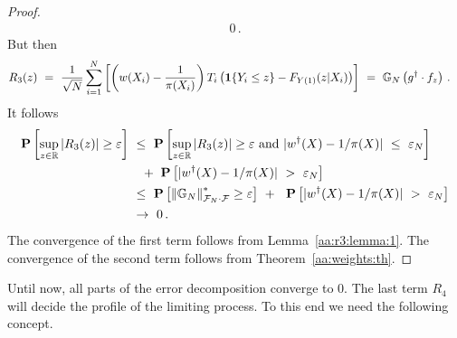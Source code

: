 \begin{proof}
\begin{align*}
  0
  \,.
  \end{align*}
  But then 
  \begin{align*}
    R_3(z)
    &
    \ 
    =
    \ 
  \frac{1}
  {
\sqrt{N}
  }
    \sum_{i=1}^{N} 
    \left[ 
    \left( 
    w(X_i) 
    -
    \frac{1}{\pi(X_i)}
    \right)
    T_i
    \left( 
    \mathbf{1}{\left\{ Y_i \le z \right\}}
    -
  F_{Y(1)}(z|X_i)
    \right)
    \right]
    \ 
    =
    \ 
    \G_N
    \left( 
      g^\dagger
      \cdot
      f_z
    \right)
    \,.
  \end{align*}
  It follows
\begin{align*}
    \P
    \left[ 
      \sup_{z\in\R}
     | 
    R_3(z)
    |
      \ge
      \varepsilon
    \right]
    &
    \ 
    \le
    \ 
    \P
    \left[ 
      \sup_{z\in\R}
     | 
    R_3(z)
    |
      \ge
      \varepsilon
      \ 
      \text{and}
      \ 
    | 
    w^\dagger(X)- 1/\pi(X)
    |
    \ 
    \le
    \ 
    \varepsilon_N
    \right]
    \\
    &
    \quad
    +
    \ 
    \P
    \left[ 
    | 
    w^\dagger(X)- 1/\pi(X)
    |
    \ 
    >
    \ 
    \varepsilon_N
    \right]
    \\
    &
    \ 
    \le
    \ 
    \P
    \left[ 
      \norm{\G_N}^*_{\mathcal{F}_N\cdot\mathcal{F}}
      \ge
      \varepsilon
    \right]
    \ 
    +
    \ 
    \ 
    \P
    \left[ 
    | 
    w^\dagger(X)- 1/\pi(X)
    |
    \ 
    >
    \ 
    \varepsilon_N
    \right]
    \\
    &
    \ 
    \to
    \ 
    0
    \,.
\end{align*}
The convergence of the first term follows from
Lemma~\ref{aa:r3:lemma:1}.
The convergence of the second term follows from
Theorem~\ref{aa:weights:th}.

\end{proof}


Until now, all parts of the error decomposition converge to 0.
The last term $R_4$ will decide the profile of the limiting process.
To this end we need the following concept.


